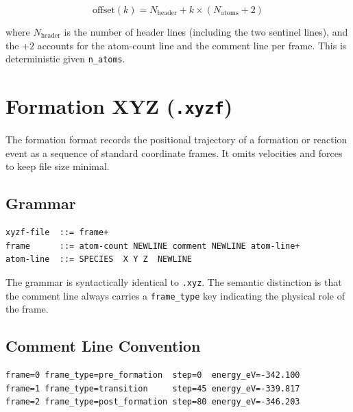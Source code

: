 \documentclass[11pt, a4paper, oneside]{article}
\begin{document}
\begin{equation}
  \mathrm{offset}(k)
  = N_{\mathrm{header}} + k \times (N_{\mathrm{atoms}} + 2)
  \label{eq:frame_offset}
\end{equation}

where $N_{\mathrm{header}}$ is the number of header lines (including the
two sentinel lines), and the $+2$ accounts for the atom-count line and the
comment line per frame. This is deterministic given \texttt{n\_atoms}.

\section{Formation XYZ (\texttt{.xyzf})}
\label{sec:xyzf}

The formation format records the positional trajectory of a formation or
reaction event as a sequence of standard coordinate frames. It omits
velocities and forces to keep file size minimal.

\subsection{Grammar}
\label{sec:xyzf_grammar}

\begin{lstlisting}[caption={Formation XYZ grammar.}]
xyzf-file  ::= frame+
frame      ::= atom-count NEWLINE comment NEWLINE atom-line+
atom-line  ::= SPECIES  X Y Z  NEWLINE
\end{lstlisting}

The grammar is syntactically identical to \texttt{.xyz}. The semantic
distinction is that the comment line always carries a \texttt{frame\_type}
key indicating the physical role of the frame.

\subsection{Comment Line Convention}
\label{sec:xyzf_comment}

\begin{lstlisting}[caption={Formation XYZ comment lines over a reaction event.}]
frame=0 frame_type=pre_formation  step=0  energy_eV=-342.100
frame=1 frame_type=transition     step=45 energy_eV=-339.817
frame=2 frame_type=post_formation step=80 energy_eV=-346.203
\end{lstlisting}
\end{document}

